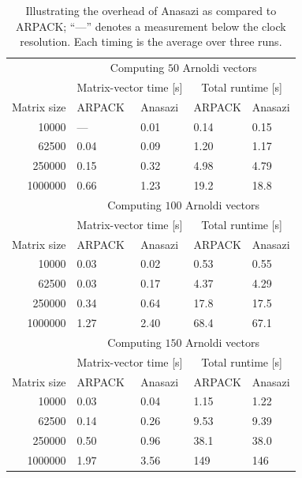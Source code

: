 \documentclass[acmtoms]{acmtrans2m}
\begin{document}
\begin{table}
\caption{Illustrating the overhead of Anasazi as compared to ARPACK; ``---'' denotes a measurement
below the clock resolution. Each timing is the average over three runs.}
\label{table:timings}
\begin{center}
\begin{tabular}{r|ll|ll|}
       \cline{2-5} %
        & \multicolumn{4}{c|}{Computing $50$ Arnoldi vectors} \\ \cline{2-5}
        & \multicolumn{2}{c|}{Matrix-vector time [s]} &
       \multicolumn{2}{c|}{Total runtime [s]}\\ \hline
       Matrix size & ARPACK & Anasazi & ARPACK & Anasazi \\ \hline %
       10000 & --- & 0.01 & 0.14 & 0.15 \\
       62500 & 0.04 & 0.09 & 1.20 & 1.17 \\
       250000 & 0.15 & 0.32 & 4.98 & 4.79 \\
       1000000 & 0.66 & 1.23 & 19.2 & 18.8 \\
       \hline
        & \multicolumn{4}{c|}{Computing $100$ Arnoldi vectors} \\ \cline{2-5}
        & \multicolumn{2}{c|}{Matrix-vector time [s]} &
       \multicolumn{2}{c|}{Total runtime [s]}\\ \hline
       Matrix size & ARPACK & Anasazi & ARPACK & Anasazi \\ \hline %
       10000 & 0.03 & 0.02 & 0.53 & 0.55 \\
       62500 & 0.03 & 0.17 & 4.37 & 4.29 \\
       250000 & 0.34 & 0.64 & 17.8 & 17.5 \\
       1000000 & 1.27 & 2.40 & 68.4 & 67.1 \\
       \hline
        & \multicolumn{4}{c|}{Computing $150$ Arnoldi vectors} \\ \cline{2-5}
        & \multicolumn{2}{c|}{Matrix-vector time [s]} &
       \multicolumn{2}{c|}{Total runtime [s]}\\ \hline
       Matrix size & ARPACK & Anasazi & ARPACK & Anasazi \\ \hline %
       10000 & 0.03 & 0.04 & 1.15 & 1.22 \\
       62500 & 0.14 & 0.26 & 9.53 & 9.39 \\
       250000 & 0.50 & 0.96 & 38.1 & 38.0 \\
       1000000 & 1.97 & 3.56 & 149 & 146 \\
       \hline
     \end{tabular}
\end{center}
\end{table}
\end{document}
